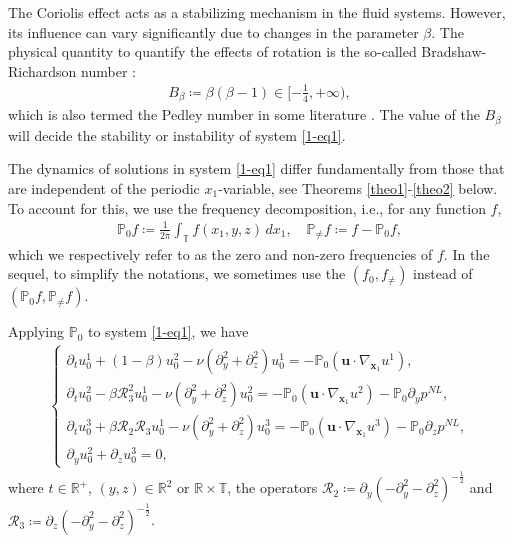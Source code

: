 \documentclass[11pt,reqno]{article}
\numberwithin{equation}{section}
\newcommand\T{{\mathbb T}}
\newcommand\PP{{\mathbb P}}
\newcommand\x{\bm{x}}
\newcommand\uu{\bm{u}}
\newcommand \tri {\coloneqq}
\let\pa=\partial
\let\f=\frac
\def \cR {\mathcal{R}}
\begin{document}
	\medskip
	
	The Coriolis effect acts as a stabilizing mechanism in the fluid  systems. However, its influence can vary significantly due to changes in the parameter $\beta$. The physical quantity to quantify the effects of rotation is the so-called Bradshaw-Richardson number \cite{Bradshaw-1969,Huang-2018}:
	\begin{align*}
		B_{\beta}\tri \beta(\beta-1)\in [-\f14,+\infty),
	\end{align*}
	which is also termed the Pedley number  in some literature \cite{Leblanc-Cambon-1997,Pedley-1969}. The value of the $B_\beta$ will decide the  stability or instability of system \eqref{1-eq1}.
	
	
	\medskip
	
	
	The dynamics of solutions in system \eqref{1-eq1} differ fundamentally from those that are independent of the periodic $x_1$-variable, see Theorems \ref{theo1}-\ref{theo2} below.
	To account for this, we use the frequency decomposition, i.e., for any function $f$, 
	\begin{align*}
		\PP_0 f \tri \frac{1}{2\pi} \int_{\T}f(x_1,y,z) \,dx_1,
		\quad 
		\PP_{\not=} f\tri f-\PP_0 f,
	\end{align*}
	which we respectively refer to as the zero and non-zero frequencies of $f$.
	In the sequel, to simplify the notations, we sometimes use the $(f_0, f_{\not=})$ instead of $(\PP_{0} f,\PP_{\not=} f)$.
	
	
	
	Applying $\PP_0$ to system \eqref{1-eq1}, we have
	\begin{align}\label{1-eq2}
		\left\{\begin{array}{l}
			\displaystyle
			\partial_{t} u_0^1 + (1-\beta)u_0^2-\nu (\partial_y^2+\partial_z^2)u_0^1
			= -\PP_0(\uu\cdot\nabla_{\x_1} u^1),
			\\[1ex]
			\displaystyle
			\partial_{t} u_0^2 - \beta \cR_3^2	%
		u_0^1-\nu (\partial_y^2+\partial_z^2)u_0^2
			= -\PP_0(\uu\cdot\nabla_{\x_1}  u^2)-\PP_0\partial_y p^{NL},
			\\[1ex]
			\displaystyle
			\partial_{t} u_0^3 + \beta \cR_2\cR_3
			u_0^1-\nu (\partial_y^2+\partial_z^2)u_0^3
			= -\PP_0(\uu\cdot\nabla_{\x_1}  u^3)-\PP_0\partial_z p^{NL},
			\\[1ex]
			\displaystyle
			\partial_y u_0^2+\partial_z u_0^3=0,
		\end{array}\right.
	\end{align}
	where $t\in \mathbb{R}^+$, $(y,z)\in\mathbb{R}^2$ or $\mathbb{R}\times \T$, the operators $\mathcal{R}_2 \tri \partial_y(-\pa_y^2-\pa_z^2)^{-\f12}$ and $\mathcal{R}_3 \tri \partial_z(-\pa_y^2-\pa_z^2)^{-\f12}$.
	
\end{document}
